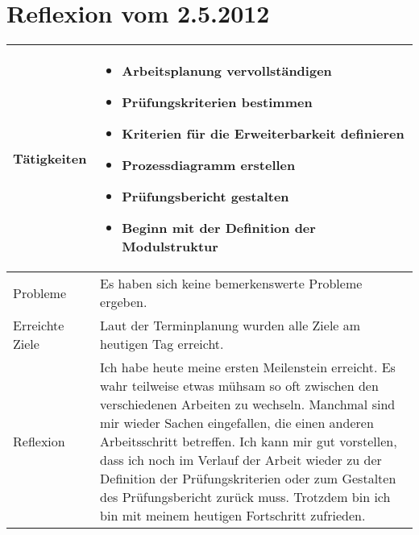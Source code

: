 \section{Reflexion vom 2.5.2012}

\begin{table}
\begin{tabular}{| l | p{10cm} |}
    \hline
    Tätigkeiten &
    \begin{itemize}
    \item Arbeitsplanung vervollständigen
    \item Prüfungskriterien bestimmen
    \item Kriterien für die Erweiterbarkeit definieren
    \item Prozessdiagramm erstellen
    \item Prüfungsbericht gestalten
    \item Beginn mit der Definition der Modulstruktur
\end{itemize}  \\
    \hline
    Probleme & 
    Es haben sich keine bemerkenswerte Probleme ergeben. \\
    \hline
    Erreichte Ziele &
    Laut der Terminplanung wurden alle Ziele am heutigen Tag erreicht. \\
    \hline 
    Reflexion &
    Ich habe heute meine ersten Meilenstein erreicht. Es wahr teilweise etwas mühsam so oft zwischen den verschiedenen Arbeiten zu wechseln. Manchmal sind mir wieder Sachen eingefallen, die einen anderen Arbeitsschritt betreffen. Ich kann mir gut vorstellen, dass ich noch im Verlauf der Arbeit wieder zu der Definition der Prüfungskriterien oder zum Gestalten des Prüfungsbericht zurück muss. Trotzdem bin ich bin mit meinem heutigen Fortschritt zufrieden. \\
    \hline
\end{tabular}
\end{table}

\clearpage
